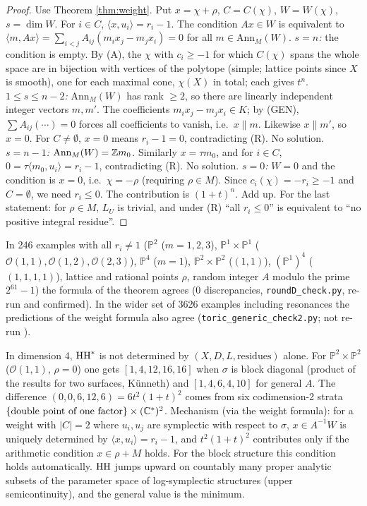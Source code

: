 \begin{proof}
Use Theorem \ref{thm:weight}. Put $x=\chi+\rho$, $C=C(\chi)$, $W=W(\chi)$, $s=\dim W$. For $i\in C$, $\langle x,u_i\rangle=r_i-1$. The condition $Ax\in W$ is equivalent to $\langle m,Ax\rangle=\sum_{i<j}A_{ij}(m_ix_j-m_jx_i)=0$ for all $m\in\mathrm{Ann}_M(W)$.
\emph{$s=n$:} the condition is empty. By (A), the $\chi$ with $c_i\ge-1$ for which $C(\chi)$ spans the whole space are in bijection with vertices of the polytope (simple; lattice points since $X$ is smooth), one for each maximal cone, $\chi(X)$ in total; each gives $t^n$.
\emph{$1\le s\le n-2$:} $\mathrm{Ann}_M(W)$ has rank $\ge2$, so there are linearly independent integer vectors $m,m'$. The coefficients $m_ix_j-m_jx_i\in K$; by (GEN), $\sum A_{ij}(\cdots)=0$ forces all coefficients to vanish, i.e.\ $x\parallel m$. Likewise $x\parallel m'$, so $x=0$. For $C\ne\emptyset$, $x=0$ means $r_i-1=0$, contradicting (R). No solution.
\emph{$s=n-1$:} $\mathrm{Ann}_M(W)=\mathbb Z m_0$. Similarly $x=\tau m_0$, and for $i\in C$, $0=\tau\langle m_0,u_i\rangle=r_i-1$, contradicting (R). No solution.
\emph{$s=0$:} $W=0$ and the condition is $x=0$, i.e.\ $\chi=-\rho$ (requiring $\rho\in M$). Since $c_i(\chi)=-r_i\ge-1$ and $C=\emptyset$, we need $r_i\le0$. The contribution is $(1+t)^n$.
Add up. For the last statement: for $\rho\in M$, $L_U$ is trivial, and under (R) ``all $r_i\le0$'' is equivalent to ``no positive integral residue''. \qedhere
\end{proof}
\tV In 246 examples with all $r_i\ne1$ ($\mathbb{P}^2$ ($m=1,2,3$), $\mathbb{P}^1\times\mathbb{P}^1$ ($\mathcal O(1,1),\mathcal O(1,2),\mathcal O(2,3)$), $\mathbb{P}^4$ ($m=1$), $\mathbb{P}^2\times\mathbb{P}^2$ ($(1,1)$), $(\mathbb{P}^1)^4$ ($(1,1,1,1)$), lattice and rational points $\rho$, random integer $A$ modulo the prime $2^{61}-1$) the formula of the theorem agrees (0 discrepancies, \texttt{roundD\_check.py}, re-run and confirmed). In the wider set of 3626 examples including resonances the predictions of the weight formula also agree (\texttt{toric\_generic\_check2.py}; not re-run \tQ).

\begin{obs}\label{obs:gen}
In dimension 4, $\mathrm{HH}^*$ is not determined by $(X,D,L,\text{residues})$ alone. For $\mathbb P^2\times\mathbb P^2$ ($\mathcal O(1,1)$, $\rho=0$) one gets $[1,4,12,16,16]$ when $\sigma$ is block diagonal (product of the results for two surfaces, K\"unneth) and $[1,4,6,4,10]$ for general $A$. The difference $(0,0,6,12,6)=6t^2(1+t)^2$ comes from six codimension-2 strata $\{\text{double point of one factor}\}\times(\mathbb C^*)^2$. Mechanism (via the weight formula): for a weight with $|C|=2$ where $u_i,u_j$ are symplectic with respect to $\sigma$, $x\in A^{-1}W$ is uniquely determined by $\langle x,u_i\rangle=r_i-1$, and $t^2(1+t)^2$ contributes only if the arithmetic condition $x\in\rho+M$ holds. For the block structure this condition holds automatically. \tK $\mathrm{HH}$ jumps upward on countably many proper analytic subsets of the parameter space of log-symplectic structures (upper semicontinuity), and the general value is the minimum.
\end{obs}

